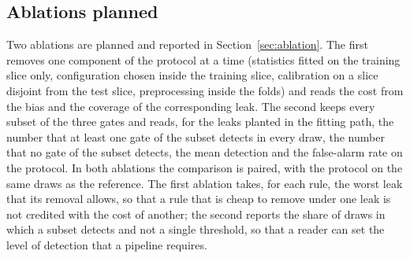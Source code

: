 \begin{table}[htbp]
\centering
\small
\caption{The experiments, the data each runs on, the number of repetitions and the seed; every repetition draws its own data, split and reference sample from the seed of the experiment and its own index, and all variants of one repetition share the draw.}
\label{tab:design}
\end{table}

\subsection{Ablations planned}

Two ablations are planned and reported in Section~\ref{sec:ablation}. The first removes one component of the protocol at a time (statistics fitted on the training slice only, configuration chosen inside the training slice, calibration on a slice disjoint from the test slice, preprocessing inside the folds) and reads the cost from the bias and the coverage of the corresponding leak. The second keeps every subset of the three gates and reads, for the leaks planted in the fitting path, the number that at least one gate of the subset detects in every draw, the number that no gate of the subset detects, the mean detection and the false-alarm rate on the protocol. In both ablations the comparison is paired, with the protocol on the same draws as the reference. The first ablation takes, for each rule, the worst leak that its removal allows, so that a rule that is cheap to remove under one leak is not credited with the cost of another; the second reports the share of draws in which a subset detects and not a single threshold, so that a reader can set the level of detection that a pipeline requires.
